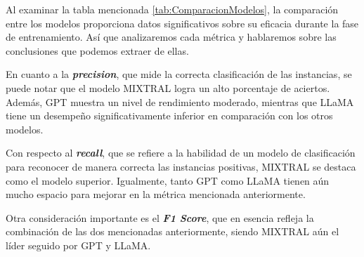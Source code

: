 \bigskip %

\begin{table}[ht!]
  \centering
  \caption{Tabla de comparación de modelos.}
  \label{tab:ComparacionModelos}
\end{table}

\bigskip %

Al examinar la tabla mencionada \ref{tab:ComparacionModelos}, la comparación entre los modelos proporciona datos significativos sobre su eficacia durante la fase de entrenamiento. Así que analizaremos cada métrica y hablaremos sobre las conclusiones que podemos extraer de ellas.

\bigskip %

En cuanto a la \textbf{\textit{precision}}, que mide la correcta clasificación de las instancias, se puede notar que el modelo MIXTRAL logra un alto porcentaje de aciertos. Además, \acrshort{GPT} muestra un nivel de rendimiento moderado, mientras que \acrshort{LLaMA} tiene un desempeño significativamente inferior en comparación con los otros modelos.

\bigskip %

Con respecto al \textbf{\textit{recall}}, que se refiere a la habilidad de un modelo de clasificación para reconocer de manera correcta las instancias positivas, MIXTRAL se destaca como el modelo superior. Igualmente, tanto \acrshort{GPT} como \acrshort{LLaMA} tienen aún mucho espacio para mejorar en la métrica mencionada anteriormente.

\bigskip %

Otra consideración importante es el \textbf{\textit{F1 Score}}, que en esencia refleja la combinación de las dos mencionadas anteriormente, siendo MIXTRAL aún el líder seguido por \acrshort{GPT} y \acrshort{LLaMA}.


